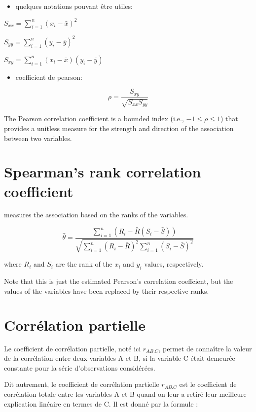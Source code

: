 \documentclass[
]{report}
\providecommand{\tightlist}{%
  \setlength{\itemsep}{0pt}\setlength{\parskip}{0pt}}
\begin{document}
\begin{itemize}
\tightlist
\item
  quelques notations pouvant être utiles:
\end{itemize}

\(S_{xx} = \sum_{i=1}^n(x_i -\bar{x})^2\)

\(S_{yy} = \sum_{i=1}^n(y_i -\bar{y})^2\)

\(S_{xy} = \sum_{i=1}^n(x_i -\bar{x})(y_i -\bar{y})\)

\begin{itemize}
\tightlist
\item
  coefficient de pearson:
\end{itemize}

\[\rho=\frac{S_{xy}}{\sqrt{S_{xx}S_{yy}}}\]

The Pearson correlation coefficient is a bounded index (i.e., \(-1 \leq \rho \leq 1\)) that provides a unitless measure for the strength and direction of the association between two variables.

\hypertarget{spearmans-rank-correlation-coefficient}{%
\section{Spearman's rank correlation coefficient}\label{spearmans-rank-correlation-coefficient}}

measures the association based on the ranks of the variables.

\[\hat{\theta}=\frac{\sum_{i=1}^n(R_i-\bar{R}(S_i-\bar{S}))}{\sqrt{\sum_{i=1}^n(R_i-\bar{R})^2\sum_{i=1}^n(S_i-\bar{S})^2}}\]

where \(R_i\) and \(S_i\) are the rank of the \(x_i\) and \(y_i\) values, respectively.

Note that this is just the estimated Pearson's correlation coeffcient, but the values of the variables have been replaced by their respective ranks.

\hypertarget{corruxe9lation-partielle}{%
\section{Corrélation partielle}\label{corruxe9lation-partielle}}

Le coefficient de corrélation partielle, noté ici \(r_{AB.C}\), permet de connaître la valeur de la corrélation entre deux variables A et B, si la variable C était demeurée constante pour la série d'observations considérées.

Dit autrement, le coefficient de corrélation partielle \(r_{AB.C}\) est le coefficient de corrélation totale entre les variables A et B quand on leur a retiré leur meilleure explication linéaire en termes de C. Il est donné par la formule :
\end{document}
